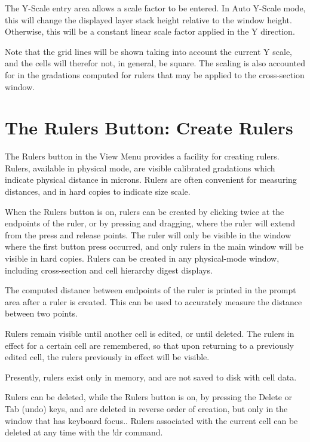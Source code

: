 The {\cb Y-Scale} entry area allows a scale factor to be entered.  In
{\cb Auto Y-Scale} mode, this will change the displayed layer stack
height relative to the window height.  Otherwise, this will be a
constant linear scale factor applied in the Y direction.

Note that the grid lines will be shown taking into account the current
Y scale, and the cells will therefor not, in general, be square.  The
scaling is also accounted for in the gradations computed for rulers
that may be applied to the cross-section window.


\section{The {\cb Rulers} Button: Create Rulers}
The {\cb Rulers} button in the {\cb View Menu} provides a facility for
creating rulers.  Rulers, available in physical mode, are visible
calibrated gradations which indicate physical distance in microns. 
Rulers are often convenient for measuring distances, and in hard
copies to indicate size scale.

When the {\cb Rulers} button is on, rulers can be created by clicking
twice at the endpoints of the ruler, or by pressing and dragging,
where the ruler will extend from the press and release points.  The
ruler will only be visible in the window where the first button press
occurred, and only rulers in the main window will be visible in hard
copies.  Rulers can be created in any physical-mode window, including
cross-section and cell hierarchy digest displays.

The computed distance between endpoints of the ruler is printed in the
prompt area after a ruler is created.  This can be used to accurately
measure the distance between two points.

Rulers remain visible until another cell is edited, or until deleted. 
The rulers in effect for a certain cell are remembered, so that upon
returning to a previously edited cell, the rulers previously in effect
will be visible.

Presently, rulers exist only in memory, and are not saved to disk with
cell data.

Rulers can be deleted, while the {\cb Rulers} button is on, by
pressing the {\kb Delete} or {\kb Tab} (undo) keys, and are deleted in
reverse order of creation, but only in the window that has keyboard
focus..  Rulers associated with the current cell can be deleted at any
time with the {\cb !dr} command.

